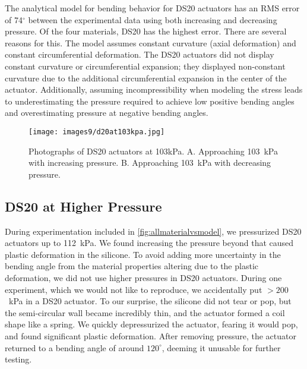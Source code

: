 The analytical model for bending behavior for DS20 actuators has an RMS error of 74$^\circ$ between the experimental data using both increasing and decreasing pressure. Of the four materials, DS20 has the highest error. There are several reasons for this. The model assumes constant curvature (axial deformation) and constant circumferential deformation. The DS20 actuators did not display constant curvature or circumferential expansion; they displayed non-constant curvature due to the additional circumferential expansion in the center of the actuator. Additionally, assuming incompressibility when modeling the stress leads to underestimating the pressure required to achieve low positive bending angles and overestimating pressure at negative bending angles. 
\\
\begin{figure}[ht]
    \centering
     \texttt{[image: images9/d20at103kpa.jpg]}
    \caption{Photographs of DS20 actuators at 103kPa. A. Approaching 103~kPa with increasing pressure. B. Approaching 103~kPa with decreasing pressure.}
    \label{fig:d20at103kpa}
\end{figure}

\subsection{DS20 at Higher Pressure}

During experimentation included in \ref{fig:allmaterialvsmodel}, we pressurized DS20 actuators up to 112~kPa. We found increasing the pressure beyond that caused plastic deformation in the silicone. To avoid adding more uncertainty in the bending angle from the material properties altering due to the plastic deformation, we did not use higher pressures in DS20 actuators. During one experiment, which we would not like to reproduce, we accidentally put $>200$~kPa in a DS20 actuator. To our surprise, the silicone did not tear or pop, but the semi-circular wall became incredibly thin, and the actuator formed a coil shape like a spring. We quickly depressurized the actuator, fearing it would pop, and found significant plastic deformation. After removing pressure, the actuator returned to a bending angle of around $120^\circ$, deeming it unusable for further testing. 

